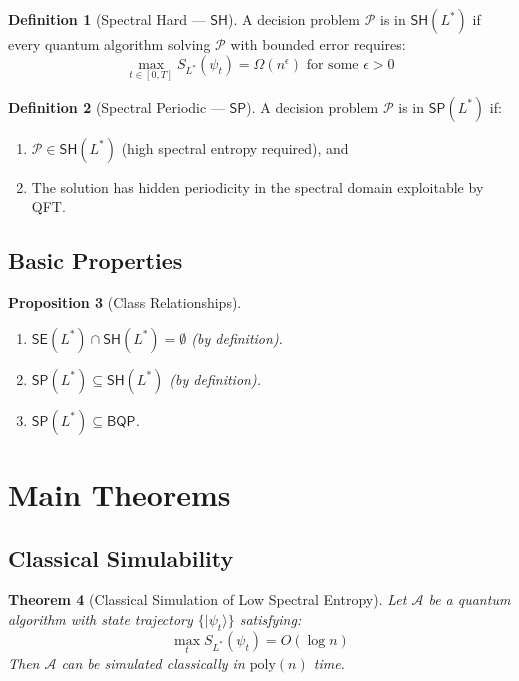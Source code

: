 \documentclass[11pt,a4paper]{article}
\theoremstyle{plain}
\newtheorem{theorem}{Theorem}[section]
\newtheorem{proposition}[theorem]{Proposition}
\theoremstyle{definition}
\newtheorem{definition}[theorem]{Definition}
\theoremstyle{remark}
\newcommand{\ket}[1]{|#1\rangle}
\newcommand{\BQP}{\mathsf{BQP}}
\newcommand{\SE}{\mathsf{SE}}
\newcommand{\SH}{\mathsf{SH}}
\newcommand{\SP}{\mathsf{SP}}
\begin{document}
\begin{definition}[Spectral Hard --- $\SH$]
A decision problem $\mathcal{P}$ is in $\SH(L^*)$ if every quantum algorithm solving $\mathcal{P}$ with bounded error requires:
\begin{equation}
    \max_{t \in [0,T]} S_{L^*}(\psi_t) = \Omega(n^\epsilon) \text{ for some } \epsilon > 0
\end{equation}
\end{definition}

\begin{definition}[Spectral Periodic --- $\SP$]
A decision problem $\mathcal{P}$ is in $\SP(L^*)$ if:
\begin{enumerate}[label=(\roman*),noitemsep]
    \item $\mathcal{P} \in \SH(L^*)$ (high spectral entropy required), and
    \item The solution has hidden periodicity in the spectral domain exploitable by QFT.
\end{enumerate}
\end{definition}

\subsection{Basic Properties}

\begin{proposition}[Class Relationships]
\begin{enumerate}[label=(\roman*),noitemsep]
    \item $\SE(L^*) \cap \SH(L^*) = \emptyset$ (by definition).
    \item $\SP(L^*) \subseteq \SH(L^*)$ (by definition).
    \item $\SP(L^*) \subseteq \BQP$.
\end{enumerate}
\end{proposition}

\section{Main Theorems}

\subsection{Classical Simulability}

\begin{theorem}[Classical Simulation of Low Spectral Entropy]\label{thm:classical-sim}
Let $\mathcal{A}$ be a quantum algorithm with state trajectory $\{\ket{\psi_t}\}$ satisfying:
\begin{equation}
    \max_t S_{L^*}(\psi_t) = O(\log n)
\end{equation}
Then $\mathcal{A}$ can be simulated classically in $\text{poly}(n)$ time.
\end{theorem}
\end{document}
